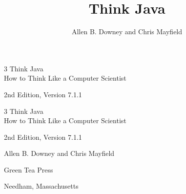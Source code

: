 \documentclass[12pt]{book}
\title{Think Java}
\author{Allen B. Downey and Chris Mayfield}
\newcommand{\thetitle}{Think Java}
\newcommand{\thesubtitle}{How to Think Like a Computer Scientist}
\newcommand{\theauthors}{Allen B. Downey and Chris Mayfield}
\newcommand{\theversion}{2nd Edition, Version 7.1.1}
\theoremstyle{exercise}
\newif\ifplastex
\begin{document}
\frontmatter

\ifplastex

\maketitle

\else

\begin{latexonly}

\thispagestyle{empty}

\begin{flushright}
\vspace*{2.0in}

\begin{spacing}{3}
{\huge \thetitle} \\
{\Large \thesubtitle}
\end{spacing}

\vspace{0.25in}

\theversion

\vfill
\end{flushright}

\newpage
\thispagestyle{empty}

\quad

\newpage
\thispagestyle{empty}

\begin{flushright}
\vspace*{2.0in}

\begin{spacing}{3}
{\huge \thetitle} \\
{\Large \thesubtitle}
\end{spacing}

\vspace{0.25in}

\theversion

\vspace{1in}

{\Large \theauthors}

\vspace{0.5in}

{\Large Green Tea Press}

{\small Needham, Massachusetts}

\vfill
\end{flushright}


\end{latexonly}
\end{document}
